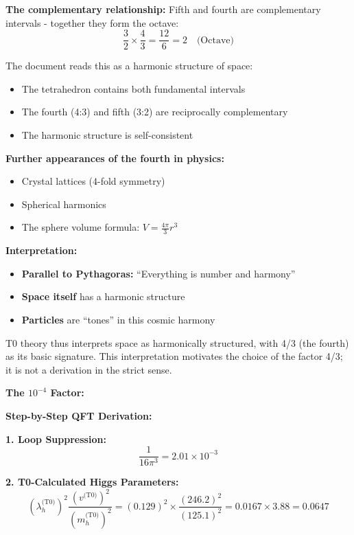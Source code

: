 \textbf{The complementary relationship:}
Fifth and fourth are complementary intervals - together they form the octave:
\begin{equation}
	\frac{3}{2} \times \frac{4}{3} = \frac{12}{6} = 2 \quad \text{(Octave)}
\end{equation}

The document reads this as a harmonic structure of space:
\begin{itemize}
	\item The tetrahedron contains both fundamental intervals
	\item The fourth (4:3) and fifth (3:2) are reciprocally complementary
	\item The harmonic structure is self-consistent
\end{itemize}

\textbf{Further appearances of the fourth in physics:}
\begin{itemize}
	\item Crystal lattices (4-fold symmetry)
	\item Spherical harmonics
	\item The sphere volume formula: $V = \frac{4\pi}{3}r^3$
\end{itemize}

\textbf{Interpretation:}
\begin{itemize}
	\item \textbf{Parallel to Pythagoras:} ``Everything is number and harmony''
	\item \textbf{Space itself} has a harmonic structure
	\item \textbf{Particles} are ``tones'' in this cosmic harmony
\end{itemize}

T0 theory thus interprets space as harmonically structured, with 4/3 (the fourth) as its basic signature. This interpretation motivates the choice of the factor 4/3; it is not a derivation in the strict sense.

\textbf{The $10^{-4}$ Factor:}

\textbf{Step-by-Step QFT Derivation:}

\textbf{1. Loop Suppression:}
\begin{equation}
	\frac{1}{16\pi^3} = 2.01 \times 10^{-3}
\end{equation}

\textbf{2. T0-Calculated Higgs Parameters:}
\begin{equation}
	(\lambda_h^{\text{(T0)}})^2 \frac{(v^{\text{(T0)}})^2}{(m_h^{\text{(T0)}})^2} = (0.129)^2 \times \frac{(246.2)^2}{(125.1)^2} = 0.0167 \times 3.88 = 0.0647
\end{equation}

